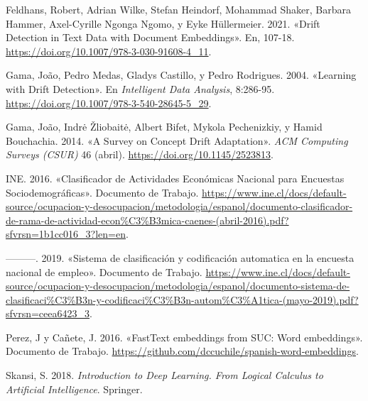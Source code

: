 \documentclass[
  12pt,
  spanish,
]{article}
\begin{document}
\leavevmode\hypertarget{ref-inbook}{}%
Feldhans, Robert, Adrian Wilke, Stefan Heindorf, Mohammad Shaker,
Barbara Hammer, Axel-Cyrille Ngonga Ngomo, y Eyke Hüllermeier. 2021.
«Drift Detection in Text Data with Document Embeddings». En, 107-18.
\url{https://doi.org/10.1007/978-3-030-91608-4_11}.

\leavevmode\hypertarget{ref-inproceedings}{}%
Gama, João, Pedro Medas, Gladys Castillo, y Pedro Rodrigues. 2004.
«Learning with Drift Detection». En \emph{Intelligent Data Analysis},
8:286-95. \url{https://doi.org/10.1007/978-3-540-28645-5_29}.

\leavevmode\hypertarget{ref-article}{}%
Gama, João, Indrė Žliobaitė, Albert Bifet, Mykola Pechenizkiy, y Hamid
Bouchachia. 2014. «A Survey on Concept Drift Adaptation». \emph{ACM
Computing Surveys (CSUR)} 46 (abril).
\url{https://doi.org/10.1145/2523813}.

\leavevmode\hypertarget{ref-ine_caenes}{}%
INE. 2016. «Clasificador de Actividades Económicas Nacional para
Encuestas Sociodemográficas». Documento de Trabajo.
\url{https://www.ine.cl/docs/default-source/ocupacion-y-desocupacion/metodologia/espanol/documento-clasificador-de-rama-de-actividad-econ\%C3\%B3mica-caenes-(abril-2016).pdf?sfvrsn=1b1cc016_3?len=en}.

\leavevmode\hypertarget{ref-codificacion_ene}{}%
---------. 2019. «Sistema de clasificación y codificación automatica en
la encuesta nacional de empleo». Documento de Trabajo.
\url{https://www.ine.cl/docs/default-source/ocupacion-y-desocupacion/metodologia/espanol/documento-sistema-de-clasificaci\%C3\%B3n-y-codificaci\%C3\%B3n-autom\%C3\%A1tica-(mayo-2019).pdf?sfvrsn=ceea6423_3}.

\leavevmode\hypertarget{ref-git_hub}{}%
Perez, J y Cañete, J. 2016. «FastText embeddings from SUC: Word
embeddings». Documento de Trabajo.
\url{https://github.com/dccuchile/spanish-word-embeddings}.

\leavevmode\hypertarget{ref-skansi}{}%
Skansi, S. 2018. \emph{Introduction to Deep Learning. From Logical
Calculus to Artificial Intelligence}. Springer.
\end{document}
